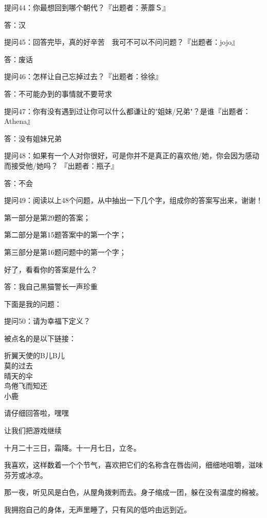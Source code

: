 \documentclass[12pt,a4paper]{article}
\def\blankrev{\vspace{1ex}}									%
\begin{document}
		\blankrev
		提问44：你最想回到哪个朝代？『出题者：荼蘼Ｓ』\par
		答：汉

		\blankrev
		提问45：回答完毕，真的好辛苦　我可不可以不问问题？『出题者：jojo』\par
		答：废话

		\blankrev
		提问46：怎样让自己忘掉过去？『出题者：徐徐』\par
		答：不可能办到的事情就不要苛求

		\blankrev
		提问47：你有没有遇到过让你可以什么都谦让的"姐妹/兄弟"？是谁『出题者：Athena』\par
		答：没有姐妹兄弟

		\blankrev
		提问48：如果有一个人对你很好，可是你并不是真正的喜欢他/她，你会因为感动而接受他/她吗？
				『出题者：瓶子』\par
		答：不会

		提问49：阅读以上48个问题，从中抽出一下几个字，组成你的答案写出来，谢谢！\par
		第一部分是第29题的答案；\par
		第二部分是第15题答案中的第一个字；\par
		第三部分是第16题问题中的第一个字；\par
		好了，看看你的答案是什么？\par
		答：我自己黑猫警长一声珍重

		\blankrev \blankrev
		下面是我的问题：\par
		提问50：请为幸福下定义？

		\blankrev
		被点名的是以下链接：

		\indentenv{4\ccwd}{0\ccwd}{}
		折翼天使的B儿B儿 \\
		莫的过去 \\
		晴天的伞 \\
		鸟倦飞而知还 \\
		小鹿
		\endindentenv

		请仔细回答啦，嘿嘿


		让我们把游戏继续

	\endwriting



		十月二十三日，霜降。十一月七日，立冬。

		我喜欢，这样数着一个个节气，喜欢把它们的名称含在唇齿间，细细地咀嚼，滋味芬芳或冰凉。

		那一夜，听见风是白色，从屋角拨剌而去。身子缩成一团，躲在没有温度的棉被。

		我拥抱自己的身体，无声里睡了，只有风的低吟由远到近。
\end{document}
